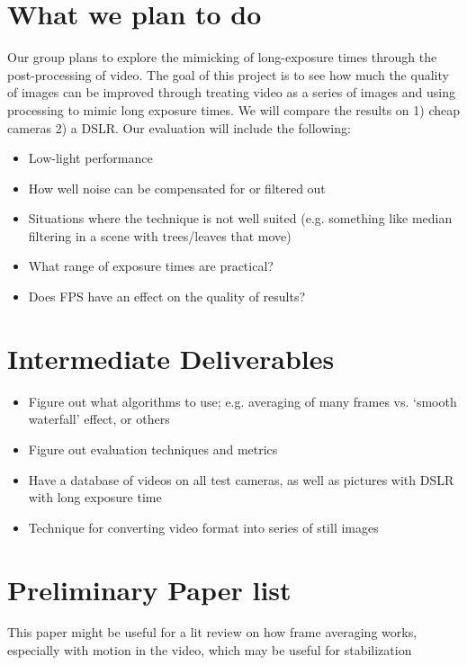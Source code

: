 \section{What we plan to do}
Our group plans to explore the mimicking of long-exposure times through the post-processing of video.
The goal of this project is to see how much the quality of images can be improved through treating
video as a series of images and using processing to mimic long exposure times. We will compare the
results on 1) cheap cameras 2) a DSLR. Our evaluation will include the following:

\begin{itemize}
\item Low-light performance
\item How well noise can be compensated for or filtered out
\item Situations where the technique is not well suited (e.g. something like median filtering in a
scene with trees/leaves that move)
\item What range of exposure times are practical?
\item Does FPS have an effect on the quality of results?
\end{itemize}

\section{Intermediate Deliverables}

\begin{itemize}
\item Figure out what algorithms to use; e.g. averaging of many frames vs. `smooth waterfall' effect, or
  others

\item Figure out evaluation techniques and metrics

\item Have a database of videos on all test cameras, as well as pictures with DSLR with long exposure time

\item Technique for converting video format into series of still images
\end{itemize}

\section{Preliminary Paper list}

This paper might be useful for a lit review on how frame averaging works, especially with motion in
the video, which may be useful for stabilization

